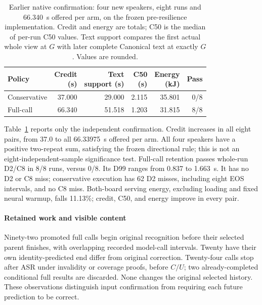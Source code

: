 \begin{table}[t]
\centering
\caption{Earlier native confirmation: four new speakers, eight runs and
66.340~s offered per arm, on the frozen pre-resilience implementation.
Credit and energy are totals; C50 is the median of per-run C50 values.
Text support compares the first actual whole view at $G$ with later
complete Canonical text at exactly $G$. Values are rounded.}
\label{tab:native_full_confirm}
\small
\setlength{\tabcolsep}{2.5pt}
\begin{tabular}{@{}lrrrrr@{}}
\toprule
Policy & \shortstack{Credit\\(s)} & \shortstack{Text\\support (s)} &
\shortstack{C50\\(s)} & \shortstack{Energy\\(kJ)} & Pass\\
\midrule
Conservative & 37.000 & 29.000 & 2.115 & 35.801 & 0/8\\
Full-call & 66.340 & 51.518 & 1.203 & 31.815 & 8/8\\
\bottomrule
\end{tabular}
\end{table}

Table~\ref{tab:native_full_confirm} reports only the independent
confirmation. Credit increases in all eight pairs,
from 37.0 to all 66.33975~s offered per arm. All four speakers have a
positive two-repeat sum, satisfying the frozen directional rule; this is
not an eight-independent-sample significance test. Full-call retention
passes whole-run D2/C8 in 8/8 runs, versus 0/8. Its D99 ranges from 0.837
to 1.663~s. It has no D2 or C8 miss;
conservative execution has 62 D2 misses, including eight EOS intervals,
and no C8 miss. Both-board serving energy, excluding loading and fixed neural warmup,
falls 11.13\%; credit, C50, and energy improve in every pair.

\paragraph{Retained work and visible content}
Ninety-two promoted full calls begin original recognition before their
selected parent finishes, with overlapping recorded model-call intervals. Twenty
have their own identity-predicted end differ from original correction.
Twenty-four calls stop after ASR under invalidity or coverage proofs,
before $C/U$; two
already-completed conditional full results are discarded. None changes
the original selected history. These observations distinguish input
confirmation from requiring each future prediction to be correct.

